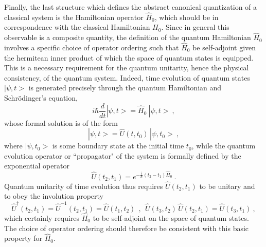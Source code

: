 \documentclass[a4paper,11pt]{article}
\begin{document}
Finally, the last structure which defines the abstract canonical quantization
of a classical system is the Hamiltonian operator $\hat{H}_0$, which should
be in correspondence with the classical Hamiltonian $H_0$. Since in general
this observable is a composite quantity, the definition of the quantum
Hamiltonian $\hat{H}_0$ involves a specific choice of operator ordering
such that $\hat{H}_0$ be self-adjoint given the hermitean inner product
of which the space of quantum states is equipped. This is a necessary
requirement for the quantum unitarity, hence the physical consistency, of
the quantum system. Indeed, time evolution of quantum states $|\psi,t>$
is generated precisely through the quantum Hamiltonian and Schr\"odinger's
equation,
\begin{equation}
i\hbar\frac{d}{dt}|\psi,t>=\hat{H}_0\ |\psi,t>\ ,
\end{equation}
whose formal solution is of the form
\begin{equation}
|\psi,t>=\hat{U}(t,t_0)\,|\psi,t_0>\ ,
\end{equation}
where $|\psi,t_0>$ is some boundary state at the initial time $t_0$,
while the quantum evolution operator or ``propagator" of the system
is formally defined by the exponential operator
\begin{equation}
\hat{U}(t_2,t_1)=e^{-\frac{i}{\hbar}(t_2-t_1)\hat{H}_0}\ .
\label{eq:evolutionoperator1}
\end{equation}
Quantum unitarity of time evolution thus requires $\hat{U}(t_2,t_1)$
to be unitary and to obey the involution property
\begin{equation}
\hat{U}^\dagger(t_2,t_1)=\hat{U}^{-1}(t_2,t_1)=\hat{U}(t_1,t_2)\ \ ,\ \ 
\hat{U}(t_3,t_2)\,\hat{U}(t_2,t_1)=\hat{U}(t_3,t_1)\ ,
\label{eq:evolutionoperator2}
\end{equation}
which certainly requires $\hat{H}_0$ to be self-adjoint on the
space of quantum states. The choice of operator ordering should
therefore be consistent with this basic property for $\hat{H}_0$.
\end{document}
